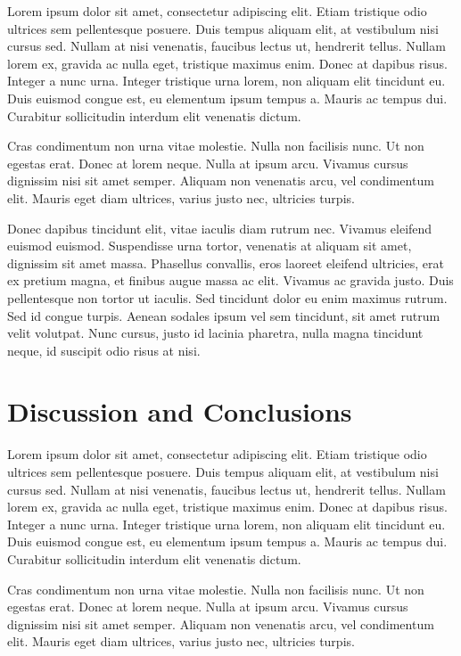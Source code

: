 \documentclass[11pt, a4paper]{resources/JTH}
\begin{document}
Lorem ipsum dolor sit amet, consectetur adipiscing elit. Etiam tristique odio ultrices sem pellentesque posuere. Duis tempus aliquam elit, at vestibulum nisi cursus sed. Nullam at nisi venenatis, faucibus lectus ut, hendrerit tellus. Nullam lorem ex, gravida ac nulla eget, tristique maximus enim. Donec at dapibus risus. Integer a nunc urna. Integer tristique urna lorem, non aliquam elit tincidunt eu. Duis euismod congue est, eu elementum ipsum tempus a. Mauris ac tempus dui. Curabitur sollicitudin interdum elit venenatis dictum.

Cras condimentum non urna vitae molestie. Nulla non facilisis nunc. Ut non egestas erat. Donec at lorem neque. Nulla at ipsum arcu. Vivamus cursus dignissim nisi sit amet semper. Aliquam non venenatis arcu, vel condimentum elit. Mauris eget diam ultrices, varius justo nec, ultricies turpis.

Donec dapibus tincidunt elit, vitae iaculis diam rutrum nec. Vivamus eleifend euismod euismod. Suspendisse urna tortor, venenatis at aliquam sit amet, dignissim sit amet massa. Phasellus convallis, eros laoreet eleifend ultricies, erat ex pretium magna, et finibus augue massa ac elit. Vivamus ac gravida justo. Duis pellentesque non tortor ut iaculis. Sed tincidunt dolor eu enim maximus rutrum. Sed id congue turpis. Aenean sodales ipsum vel sem tincidunt, sit amet rutrum velit volutpat. Nunc cursus, justo id lacinia pharetra, nulla magna tincidunt neque, id suscipit odio risus at nisi.

\chapter{Discussion and Conclusions}
\label{chap:DiscussionConclusions}

Lorem ipsum dolor sit amet, consectetur adipiscing elit. Etiam tristique odio ultrices sem pellentesque posuere. Duis tempus aliquam elit, at vestibulum nisi cursus sed. Nullam at nisi venenatis, faucibus lectus ut, hendrerit tellus. Nullam lorem ex, gravida ac nulla eget, tristique maximus enim. Donec at dapibus risus. Integer a nunc urna. Integer tristique urna lorem, non aliquam elit tincidunt eu. Duis euismod congue est, eu elementum ipsum tempus a. Mauris ac tempus dui. Curabitur sollicitudin interdum elit venenatis dictum.

Cras condimentum non urna vitae molestie. Nulla non facilisis nunc. Ut non egestas erat. Donec at lorem neque. Nulla at ipsum arcu. Vivamus cursus dignissim nisi sit amet semper. Aliquam non venenatis arcu, vel condimentum elit. Mauris eget diam ultrices, varius justo nec, ultricies turpis.
\end{document}
